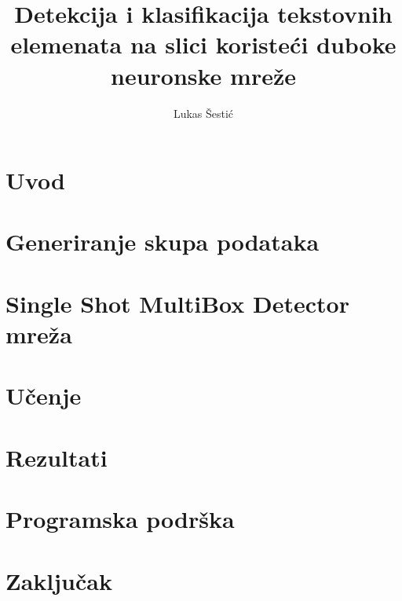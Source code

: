 \documentclass[utf8, zavrsni]{fer}
\begin{document}
\title{Detekcija i klasifikacija tekstovnih elemenata na slici koristeći duboke neuronske mreže}
\author{Lukas Šestić}
\maketitle


\tableofcontents

\chapter{Uvod}


\chapter{Generiranje skupa podataka}


\chapter{Single Shot MultiBox Detector mreža}


\chapter{Učenje}


\chapter{Rezultati}


\chapter{Programska podrška}


\chapter{Zaključak}




\end{document}
